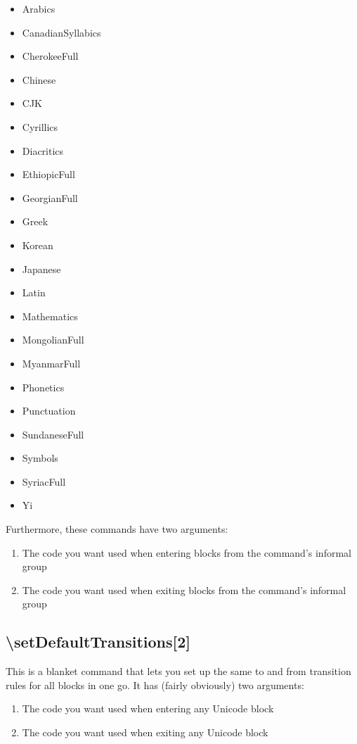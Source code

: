 \documentclass{article}
\newenvironment{itemlist}{%
  \begin{itemize}
	\setlength{\itemsep}{0pt}
	\setlength{\parsep}{0pt}
	\setlength{\topsep}{0pt}
	\setlength{\partopsep}{0pt}
	\setlength{\parskip}{0pt}
	\setlength{\labelsep}{5pt}}%
{
  \end{itemize}}
\newenvironment{numberlist}{%
  \begin{enumerate}
	\setlength{\itemsep}{0pt}
	\setlength{\parsep}{0pt}
	\setlength{\topsep}{0pt}
	\setlength{\partopsep}{0pt}
	\setlength{\parskip}{0pt}
	\setlength{\labelsep}{5pt}}%
{
  \end{enumerate}}
\begin{document}
			\begin{itemlist}
				\item Arabics
				\item CanadianSyllabics
				\item CherokeeFull
				\item Chinese
				\item CJK
				\item Cyrillics
				\item Diacritics
				\item EthiopicFull
				\item GeorgianFull
				\item Greek
				\item Korean
				\item Japanese
				\item Latin
				\item Mathematics
				\item MongolianFull
				\item MyanmarFull
				\item Phonetics
				\item Punctuation
				\item SundaneseFull
				\item Symbols
				\item SyriacFull
				\item Yi
			\end{itemlist}

			Furthermore, these commands have two arguments:

			\begin{numberlist}
				\item The code you want used when entering blocks from the command's informal group
				\item The code you want used when exiting blocks from the command's informal group
			\end{numberlist}

		\subsection{\textbackslash setDefaultTransitions[2]}

			This is a blanket command that lets you set up the same to and from transition rules for all blocks in one go. It has (fairly obviously) two arguments:

			\begin{numberlist}
				\item The code you want used when entering any Unicode block
				\item The code you want used when exiting any Unicode block
			\end{numberlist}
\end{document}
